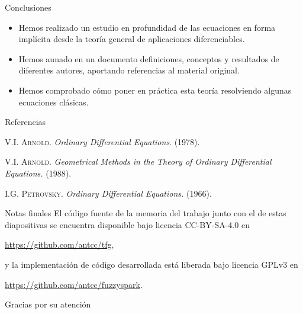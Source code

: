 \documentclass[10pt, spanish]{beamer}
\begin{document}
\begin{frame}{Conclusiones}
  \begin{itemize}
  \item Hemos realizado un estudio en profundidad de las ecuaciones en forma implícita desde la teoría general de aplicaciones diferenciables.
  \item Hemos aunado en un documento definiciones, conceptos y resultados de diferentes autores, aportando referencias al material original.
  \item Hemos comprobado cómo poner en práctica esta teoría resolviendo algunas ecuaciones clásicas.
\end{itemize}
\end{frame}

\begin{frame}{Referencias}
\begin{thebibliography}{9}

  \textsc{V.I. Arnold}. \textit{Ordinary Differential Equations}. (1978).

\textsc{V.I. Arnold}. \textit{Geometrical Methods in the Theory of Ordinary Differential Equations.} (1988).

\textsc{I.G. Petrovsky}. \textit{Ordinary Differential Equations.} (1966).

\end{thebibliography}
\end{frame}

\begin{frame}{Notas finales}
El código fuente de la memoria del trabajo junto con el de estas diapositivas se encuentra disponible bajo licencia CC-BY-SA-4.0 en
\begin{center}
\url{https://github.com/antcc/tfg},
\end{center}

y la implementación de código desarrollada está liberada bajo licencia GPLv3 en
\begin{center}
\url{https://github.com/antcc/fuzzyspark}.
\end{center}

\end{frame}

\begin{frame}[standout]
Gracias por su atención
\end{frame}
\end{document}
